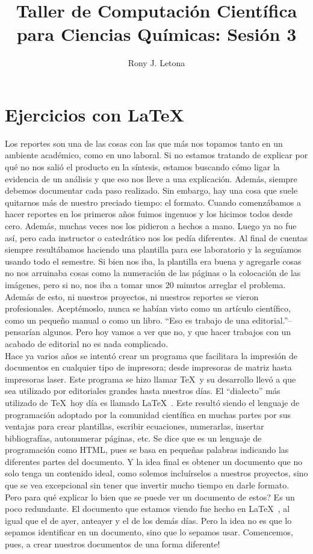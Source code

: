 \documentclass[10pt,letterpaper]{article}
\author{Rony J. Letona}
\title{Taller de Computaci\'on Cient\'ifica para Ciencias Qu\'imicas: Sesi\'on 3}
\begin{document}
\maketitle

\section{Ejercicios con \LaTeX\ }
Los reportes son una de las cosas con las que m\'as nos topamos tanto en un ambiente acad\'emico, como en uno laboral. Si no estamos tratando de explicar por qu\'e no nos sali\'o el producto en la s\'intesis, estamos buscando c\'omo ligar la evidencia de un an\'alisis y que eso nos lleve a una explicaci\'on. Adem\'as, siempre debemos documentar cada paso realizado. Sin embargo, hay una cosa que suele quitarnos m\'as de nuestro preciado tiempo: el formato. Cuando comenz\'abamos a hacer reportes en los primeros a\~nos fuimos ingenuos y los hicimos todos desde cero. Adem\'as, muchas veces nos los pidieron a hechos a mano. Luego ya no fue as\'i, pero cada instructor o catedr\'atico nos los ped\'ia diferentes. Al final de cuentas siempre result\'abamos haciendo una plantilla para ese laboratorio y la segu\'iamos usando todo el semestre. Si bien nos iba, la plantilla era buena y agregarle cosas no nos arruinaba cosas como la numeraci\'on de las p\'aginas o la colocaci\'on de las im\'agenes, pero si no, nos iba a tomar unos 20 minutos arreglar el problema. Adem\'as de esto, ni nuestros proyectos, ni nuestros reportes se vieron profesionales. Acept\'emoslo, nunca se hab\'ian visto como un art\'iculo cient\'ifico, como un peque\~no manual o como un libro. ``Eso es trabajo de una editorial.''--pensar\'ian algunos. Pero hoy vamos a ver que no, y que hacer trabajos con un acabado de editorial no es nada complicado.\\

Hace ya varios a\~nos se intent\'o crear un programa que facilitara la impresi\'on de documentos en cualquier tipo de impresora; desde impresoras de matriz hasta impresoras laser. Este programa se hizo llamar \TeX\ y su desarrollo llev\'o a que sea utilizado por editoriales grandes hasta nuestros d\'ias. El ``dialecto'' m\'as utilizado de \TeX\ hoy d\'ia es llamado \LaTeX\ . Este result\'o siendo el lenguaje de programaci\'on adoptado por la comunidad cient\'ifica en muchas partes por sus ventajas para crear plantillas, escribir ecuaciones, numerarlas, insertar bibliograf\'ias, autonumerar p\'aginas, etc. Se dice que es un lenguaje de programaci\'on como HTML, pues se basa en peque\~nas palabras indicando las diferentes partes del documento. Y la idea final es obtener un documento que no solo tenga un contenido ideal, como solemos inclu\'irselos a nuestros proyectos, sino que se vea excepcional sin tener que invertir mucho tiempo en darle formato. Pero para qu\'e explicar lo bien que se puede ver un documento de estos? Es un poco redundante. El documento que estamos viendo fue hecho en \LaTeX\ , al igual que el de ayer, anteayer y el de los dem\'as d\'ias. Pero la idea no es que lo sepamos identificar en un documento, sino que lo sepamos usar. Comencemos, pues, a crear nuestros documentos de una forma diferente!
\end{document}
